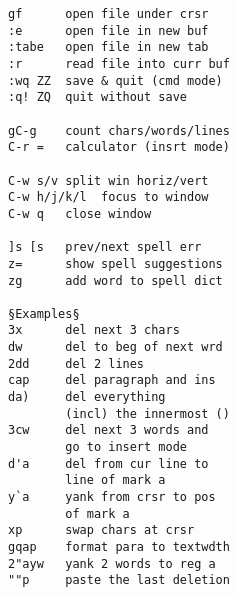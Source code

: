 \documentclass{article}
\begin{document}
\begin{multicols}{4}
\begin{lstlisting}
gf      open file under crsr
:e      open file in new buf
:tabe   open file in new tab
:r      read file into curr buf
:wq ZZ  save & quit (cmd mode)
:q! ZQ  quit without save

gC-g    count chars/words/lines
C-r =   calculator (insrt mode)

C-w s/v split win horiz/vert
C-w h/j/k/l  focus to window
C-w q   close window

]s [s   prev/next spell err
z=      show spell suggestions
zg      add word to spell dict

§Examples§
3x      del next 3 chars
dw      del to beg of next wrd
2dd     del 2 lines
cap     del paragraph and ins
da)     del everything
        (incl) the innermost ()
3cw     del next 3 words and
        go to insert mode
d'a     del from cur line to
        line of mark a
y`a     yank from crsr to pos
        of mark a
xp      swap chars at crsr
gqap    format para to textwdth
2"ayw   yank 2 words to reg a
""p     paste the last deletion
\end{lstlisting}
\end{multicols}
\end{document}
